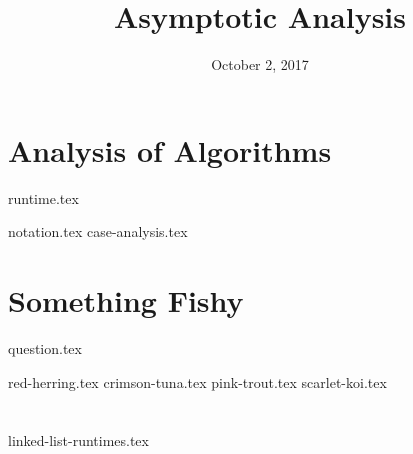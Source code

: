 \documentclass[11pt]{exam}
\title{Asymptotic Analysis}
\date{October 2, 2017}
\begin{document}
\maketitle

\section{Analysis of Algorithms}
{runtime.tex}
\begin{questions}
{notation.tex}
{case-analysis.tex}
\end{questions}

\clearpage

\section{Something Fishy}
{question.tex}
\begin{questions}
{red-herring.tex}
{crimson-tuna.tex}
{pink-trout.tex}
{scarlet-koi.tex}
\end{questions}

\clearpage

\section{}
\begin{questions}
{linked-list-runtimes.tex}
\end{questions}
\end{document}
